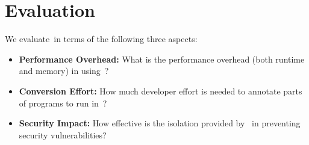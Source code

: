 \section{Evaluation}\label{sec:evaluation}

We evaluate~\systemname in terms of the following three aspects:
\begin{itemize}
\item\textbf{Performance Overhead:} What is the performance overhead (both runtime and memory) in using~\systemname?
\item\textbf{Conversion Effort:} How much developer effort is needed to annotate parts of programs to run in~\systemname?
\item\textbf{Security Impact:} How effective is the isolation provided by~\systemname{} in preventing security vulnerabilities?
\end{itemize}


